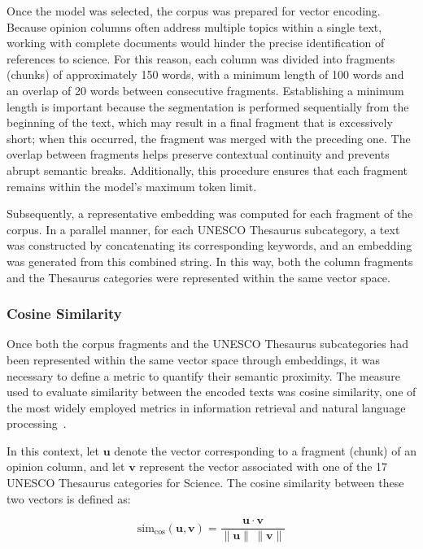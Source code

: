 \documentclass[pdflatex,sn-mathphys-num,iicol]{sn-jnl}
\begin{document}
	Once the model was selected, the corpus was prepared for vector encoding. Because opinion columns often address multiple topics within a single text, working with complete documents would hinder the precise identification of references to science. For this reason, each column was divided into fragments (chunks) of approximately 150 words, with a minimum length of 100 words and an overlap of 20 words between consecutive fragments. Establishing a minimum length is important because the segmentation is performed sequentially from the beginning of the text, which may result in a final fragment that is excessively short; when this occurred, the fragment was merged with the preceding one. The overlap between fragments helps preserve contextual continuity and prevents abrupt semantic breaks. Additionally, this procedure ensures that each fragment remains within the model’s maximum token limit.
	
	Subsequently, a representative embedding was computed for each fragment of the corpus. In a parallel manner, for each UNESCO Thesaurus subcategory, a text was constructed by concatenating its corresponding keywords, and an embedding was generated from this combined string. In this way, both the column fragments and the Thesaurus categories were represented within the same vector space.
	
	\subsubsection{Cosine Similarity}\label{subsubsec:cosine}
	
	Once both the corpus fragments and the UNESCO Thesaurus subcategories had been represented within the same vector space through embeddings, it was necessary to define a metric to quantify their semantic proximity. The measure used to evaluate similarity between the encoded texts was cosine similarity, one of the most widely employed metrics in information retrieval and natural language processing~\cite{jurafsky2025}.
	
	In this context, let $\mathbf{u}$ denote the vector corresponding to a fragment (chunk) of an opinion column, and let $\mathbf{v}$ represent the vector associated with one of the 17 UNESCO Thesaurus categories for Science. The cosine similarity between these two vectors is defined as:
	
	\begin{equation}
		\text{sim}_{\cos}(\mathbf{u}, \mathbf{v}) =
		\frac{\mathbf{u} \cdot \mathbf{v}}
		{\lVert \mathbf{u} \rVert \, \lVert \mathbf{v} \rVert}
		\label{eq:cosine}
	\end{equation}
	
\end{document}
